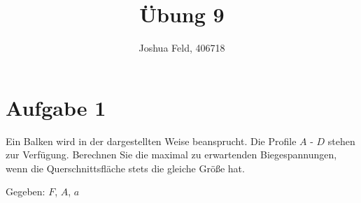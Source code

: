 \documentclass{exercise}
\institute{Lehr- und Forschungsgebiet Kontinuumsmechanik}
\title{Übung 9}
\author{Joshua Feld, 406718}
\begin{document}
    \maketitle
    
    
    \section*{Aufgabe 1}
    
    \begin{problem}
        Ein Balken wird in der dargestellten Weise beansprucht.
        Die Profile \(A\) - \(D\) stehen zur Verfügung.
        Berechnen Sie die maximal zu erwartenden Biegespannungen, wenn die Querschnittsfläche stets die gleiche Größe hat.
        
        Gegeben: \(F\), \(A\), \(a\)
    \end{problem}
    
\end{document}
